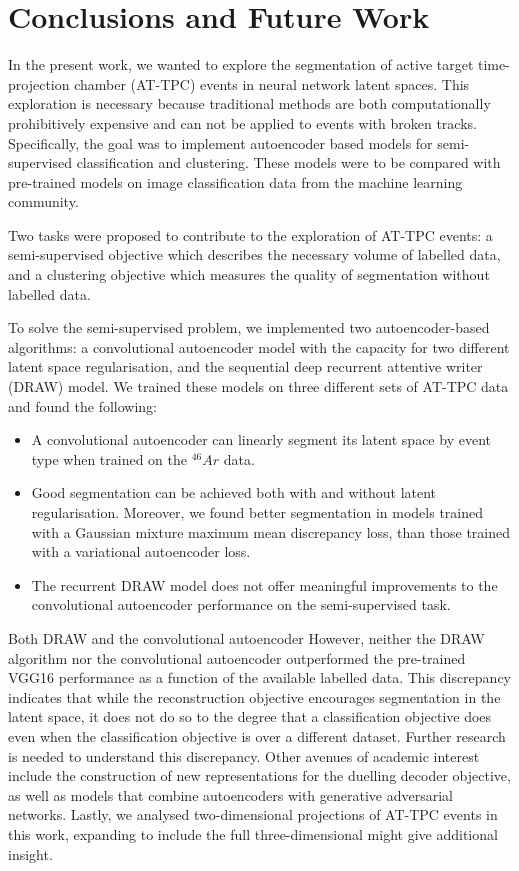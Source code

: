 \chapter{Conclusions and Future Work}


In the present work, we wanted to explore the segmentation of active target time-projection chamber (AT-TPC) events in neural network latent spaces. This exploration is necessary because traditional methods are both computationally prohibitively expensive and can not be applied to events with broken tracks. Specifically, the goal was to implement autoencoder based models for semi-supervised classification and clustering. These models were to be compared with pre-trained models on image classification data from the machine learning community.

Two tasks were proposed to contribute to the exploration of  AT-TPC events: a semi-supervised objective which describes the necessary volume of labelled data, and a clustering objective which measures the quality of segmentation without labelled data. 

To solve the semi-supervised problem, we implemented two autoencoder-based algorithms: a convolutional autoencoder model with the capacity for two different latent space regularisation, and the sequential deep recurrent attentive writer (DRAW) model. We trained these models on three different sets of AT-TPC data and found the following:

\begin{itemize}
\item A convolutional autoencoder can linearly segment its latent space by event type when trained on the ${}^{46}Ar$ data.  
\item Good segmentation can be achieved both with and without latent regularisation.  Moreover, we found better segmentation in models trained with a Gaussian mixture maximum mean discrepancy loss, than those trained with a variational autoencoder loss. 
\item The recurrent DRAW  model does not offer meaningful improvements to the convolutional autoencoder performance on the semi-supervised task. 
\end{itemize}

Both DRAW and the convolutional autoencoder 
However, neither the DRAW algorithm nor the convolutional autoencoder outperformed the pre-trained VGG16 performance as a function of the available labelled data. This discrepancy indicates that while the reconstruction objective encourages segmentation in the latent space, it does not do so to the degree that a classification objective does even when the classification objective is over a different dataset. Further research is needed to understand this discrepancy. Other avenues of academic interest include the construction of new representations for the duelling decoder objective, as well as models that combine autoencoders with generative adversarial networks.  Lastly, we analysed two-dimensional projections of AT-TPC events in this work, expanding to include the full three-dimensional might give additional insight.

